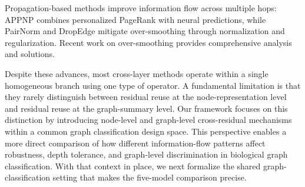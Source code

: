 Propagation-based methods improve information flow across multiple hops: APPNP \cite{klicpera2018combining} combines personalized PageRank with neural predictions, while PairNorm \cite{zhao2020pair} and DropEdge \cite{rong2019dropedge} mitigate over-smoothing through normalization and regularization. Recent work on over-smoothing \cite{chen2023revisiting, zhao2020tackling} provides comprehensive analysis and solutions.

Despite these advances, most cross-layer methods operate within a single homogeneous branch using one type of operator. A fundamental limitation is that they rarely distinguish between residual reuse at the node-representation level and residual reuse at the graph-summary level. Our framework focuses on this distinction by introducing node-level and graph-level cross-residual mechanisms within a common graph classification design space. This perspective enables a more direct comparison of how different information-flow patterns affect robustness, depth tolerance, and graph-level discrimination in biological graph classification. With that context in place, we next formalize the shared graph-classification setting that makes the five-model comparison precise.
